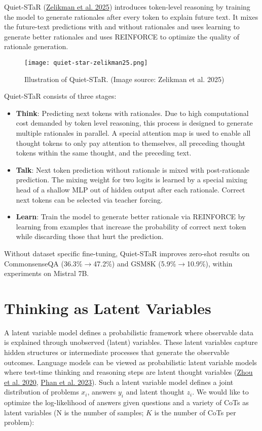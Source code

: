 \documentclass[12pt]{article}
\begin{document}
Quiet-STaR (\href{https://arxiv.org/abs/2403.09629}{Zelikman et al. 2025}) introduces token-level reasoning by training the model to generate rationales after every token to explain future text. It mixes the future-text predictions with and without rationales and uses learning to generate better rationales and uses REINFORCE to optimize the quality of rationale generation.

\begin{figure}[h]
    \centering
    \texttt{[image: quiet-star-zelikman25.png]}
    \caption{Illustration of Quiet-STaR. (Image source: Zelikman et al. 2025)}
\end{figure}

Quiet-STaR consists of three stages:
\begin{itemize}
    \item \textbf{Think}: Predicting next tokens with rationales. Due to high computational cost demanded by token level reasoning, this process is designed to generate multiple rationales in parallel. A special attention map is used to enable all thought tokens to only pay attention to themselves, all preceding thought tokens within the same thought, and the preceding text.
    \item \textbf{Talk}: Next token prediction without rationale is mixed with post-rationale prediction. The mixing weight for two logits is learned by a special mixing head of a shallow MLP out of hidden output after each rationale. Correct next tokens can be selected via teacher forcing.
    \item \textbf{Learn}: Train the model to generate better rationale via REINFORCE by learning from examples that increase the probability of correct next token while discarding those that hurt the prediction.
\end{itemize}

Without dataset specific fine-tuning, Quiet-STaR improves zero-shot results on CommonsenseQA (36.3\%$\rightarrow$47.2\%) and GSM8K (5.9\%$\rightarrow$10.9\%), within experiments on Mistral 7B.

\section{Thinking as Latent Variables}
A latent variable model defines a probabilistic framework where observable data is explained through unobserved (latent) variables. These latent variables capture hidden structures or intermediate processes that generate the observable outcomes. Language models can be viewed as probabilistic latent variable models where test-time thinking and reasoning steps are latent thought variables (\href{https://arxiv.org/abs/2011.05268}{Zhou et al. 2020}, \href{https://arxiv.org/abs/2312.02179}{Phan et al. 2023}). Such a latent variable model defines a joint distribution of problems $x_i$, answers $y_i$ and latent thought $z_i$. We would like to optimize the log-likelihood of answers given questions and a variety of CoTs as latent variables (N is the number of samples; $K$ is the number of CoTs per problem):
\end{document}
